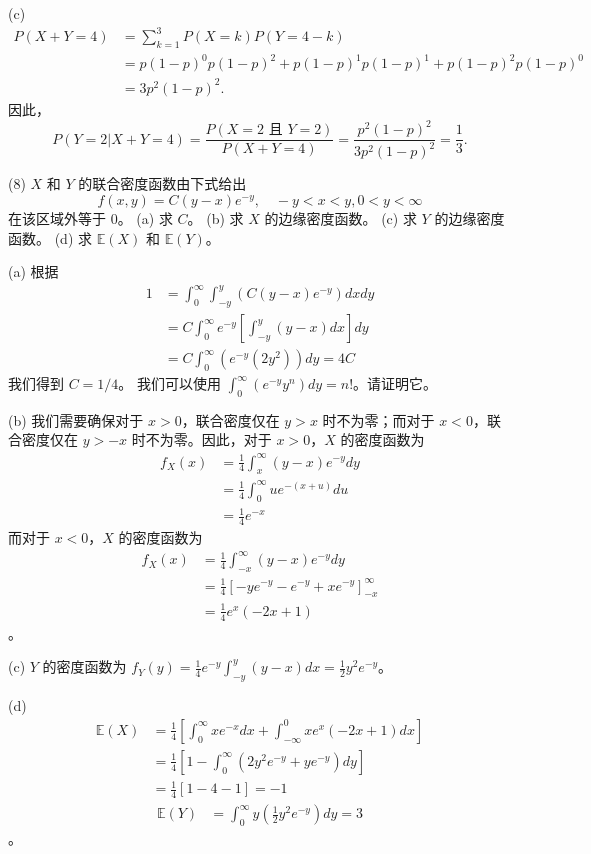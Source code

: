 \begin{questions}
\begin{solution}
(c) 
\begin{align*}
P(X + Y = 4) &= \sum_{k=1}^3 P(X = k)P(Y = 4 - k) \\
&= p(1 - p)^0 p(1 - p)^2 + p(1 - p)^1 p(1 - p)^1 + p(1 - p)^2 p(1 - p)^0 \\
&= 3p^2 (1 - p)^2.
\end{align*}
因此，
\[
P(Y = 2 | X + Y = 4) = \frac{P(X = 2 \text{ 且 } Y = 2)}{P(X + Y = 4)} = \frac{p^2 (1 - p)^2}{3p^2 (1 - p)^2} = \frac{1}{3}.
\]
\end{solution}

\question (8) $X$ 和 $Y$ 的联合密度函数由下式给出
\[
f(x,y) = C(y - x)e^{-y}, \quad -y < x < y, 0 < y < \infty
\]
在该区域外等于 0。
(a) 求 $C$。
(b) 求 $X$ 的边缘密度函数。
(c) 求 $Y$ 的边缘密度函数。
(d) 求 $\mathbb{E}(X)$ 和 $\mathbb{E}(Y)$。

\begin{solution}
(a) 根据
\begin{align*}
1 &= \int_0^{\infty} \int_{-y}^y (C(y - x)e^{-y}) dx dy \\
&= C \int_0^{\infty} e^{-y} \left[ \int_{-y}^y (y - x) dx \right] dy \\
&= C \int_0^{\infty} (e^{-y}(2y^2)) dy = 4C
\end{align*}
我们得到 $C = 1/4$。
我们可以使用 $\int_0^{\infty} (e^{-y} y^n) dy = n!$。请证明它。

(b) 我们需要确保对于 $x > 0$，联合密度仅在 $y > x$ 时不为零；而对于 $x < 0$，联合密度仅在 $y > -x$ 时不为零。因此，对于 $x > 0$，$X$ 的密度函数为
\begin{align*}
f_X(x) &= \frac{1}{4} \int_x^{\infty} (y - x)e^{-y} dy \\
&= \frac{1}{4} \int_0^{\infty} ue^{-(x+u)} du \\
&= \frac{1}{4} e^{-x}
\end{align*}
而对于 $x < 0$，$X$ 的密度函数为
\begin{align*}
f_X(x) &= \frac{1}{4} \int_{-x}^{\infty} (y - x)e^{-y} dy \\
&= \frac{1}{4} \left[ -ye^{-y} - e^{-y} + xe^{-y} \right]_{-x}^{\infty} \\
&= \frac{1}{4} e^x (-2x + 1)
\end{align*}。

(c) $Y$ 的密度函数为 $f_Y(y) = \frac{1}{4} e^{-y} \int_{-y}^y (y - x) dx = \frac{1}{2} y^2 e^{-y}$。

(d)
\begin{align*}
\mathbb{E}(X) &= \frac{1}{4} \left[ \int_0^{\infty} xe^{-x} dx + \int_{-\infty}^0 xe^x (-2x + 1) dx \right] \\
&= \frac{1}{4} \left[ 1 - \int_0^{\infty} (2y^2 e^{-y} + ye^{-y}) dy \right] \\
&= \frac{1}{4} [1 - 4 - 1] = -1
\end{align*}
\begin{align*}
\mathbb{E}(Y) &= \int_0^{\infty} y \left( \frac{1}{2} y^2 e^{-y} \right) dy = 3
\end{align*}。
\end{solution}


\end{questions}
